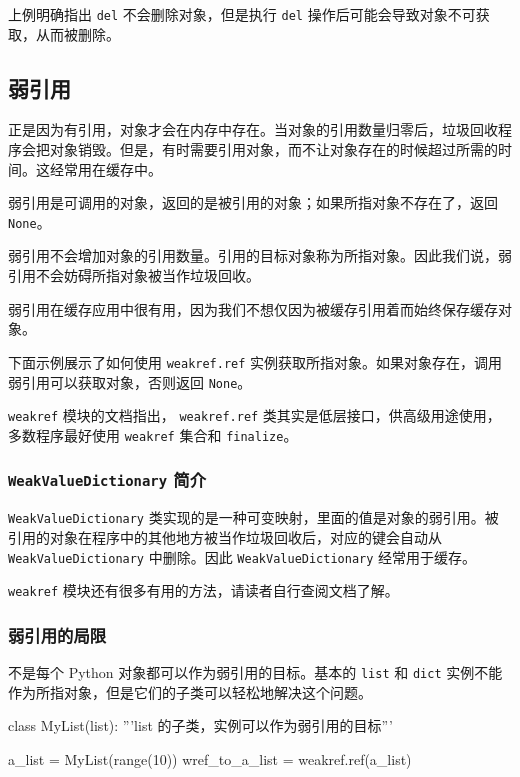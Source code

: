 上例明确指出 \texttt{del} 不会删除对象，但是执行 \texttt{del} 操作后可能会导致对象不可获取，从而被删除。

\subsection{弱引用}

正是因为有引用，对象才会在内存中存在。当对象的引用数量归零后，垃圾回收程序会把对象销毁。但是，有时需要引用对象，而不让对象存在的时候超过所需的时间。这经常用在缓存中。

弱引用是可调用的对象，返回的是被引用的对象；如果所指对象不存在了，返回 \texttt{None}。

弱引用不会增加对象的引用数量。引用的目标对象称为所指对象。因此我们说，弱引用不会妨碍所指对象被当作垃圾回收。

弱引用在缓存应用中很有用，因为我们不想仅因为被缓存引用着而始终保存缓存对象。

下面示例展示了如何使用 \texttt{weakref.ref} 实例获取所指对象。如果对象存在，调用弱引用可以获取对象，否则返回 \texttt{None}。



\texttt{weakref} 模块的文档指出， \texttt{weakref.ref} 类其实是低层接口，供高级用途使用，多数程序最好使用 \texttt{weakref} 集合和 \texttt{finalize}。

\subsubsection{\texttt{WeakValueDictionary} 简介}

\texttt{WeakValueDictionary} 类实现的是一种可变映射，里面的值是对象的弱引用。被引用的对象在程序中的其他地方被当作垃圾回收后，对应的键会自动从 \texttt{WeakValueDictionary} 中删除。因此 \texttt{WeakValueDictionary} 经常用于缓存。



\texttt{weakref} 模块还有很多有用的方法，请读者自行查阅文档了解。

\subsubsection{弱引用的局限}

不是每个 Python 对象都可以作为弱引用的目标。基本的 \texttt{list} 和 \texttt{dict} 实例不能作为所指对象，但是它们的子类可以轻松地解决这个问题。

\begin{python}
class MyList(list):
    '''list 的子类，实例可以作为弱引用的目标'''

a_list = MyList(range(10))
wref_to_a_list = weakref.ref(a_list)
\end{python}

